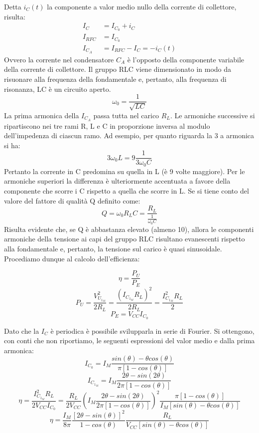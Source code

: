 Detta $i_C(t)$ la componente a valor medio nullo della corrente di collettore, risulta:
$$
\begin{aligned}
I_C     &=I_{C_0} + i_C\\
I_{RFC} &=I_{C_0}\\
I_{C_A} &=I_{RFC} -I_C = -i_C (t)
\end{aligned}
$$
Ovvero la corrente nel condensatore $C_A$ è l'opposto della componente variabile della corrente di
collettore.
Il gruppo RLC viene dimensionato in modo da risuonare alla frequenza della fondamentale e,
pertanto, alla frequenza di risonanza, LC è un circuito aperto.
$$\omega_0 = \frac{1}{\sqrt{LC}}$$
La prima armonica della $I_{C_A}$ passa tutta nel carico $R_L$. Le armoniche successive si ripartiscono nei tre rami R, L e C in proporzione inversa al modulo dell'impedenza di ciascun ramo. Ad esempio, per
quanto riguarda la 3 a armonica si ha:
$$
3 \omega_0 L = 9 \frac{1}{3 \omega_0 C}
$$
Pertanto la corrente in C predomina su quella in L (è 9 volte maggiore). Per le armoniche superiori
la differenza è ulteriormente accentuata a favore della componente che scorre i C rispetto a quella
che scorre in L. Se si tiene conto del valore del fattore di qualità Q definito come:
$$
Q = \omega_0 R_L C = \frac{R_L}{\frac{1}{\omega_0 C}}
$$
Risulta evidente che, se Q è abbastanza elevato (almeno 10), allora le componenti armoniche della tensione ai capi del gruppo
RLC risultano evanescenti rispetto alla fondamentale e, pertanto, la tensione sul carico è quasi
sinusoidale. Procediamo dunque al calcolo dell'efficienza:

\[\eta = \frac{P_U}{P_E}\]
\[P_U = \frac{V_{U_{1_M}}^2}{2R_L} = \frac{(I_{C_{1_M}} R_L)^2}{2R_L} = \frac{{I_{C_{1_M}}^2 R_L}}{2}\]
\[P_E = V_{CC}I_{C_0}\]

Dato che la $I_C$ è periodica è possibile svilupparla in serie di Fourier. Si ottengono, con conti che non riportiamo, le seguenti espressioni del valor medio e dalla prima armonica:
\[ I_{C_0} = I_M \frac{sin(\theta)-\theta cos(\theta)}{\pi \left[1-cos(\theta)\right]} \]
\[ I_{C_{1_M}} = I_M \frac{2\theta-sin(2\theta)}{2\pi \left[1-cos(\theta)\right]} \]
\[\eta = \frac{I_{C_{1_M}}^2 R_L}{2V_{CC}I_{C_0}} = \frac{R_L}{2V_{CC}} \left( I_M \frac{2\theta-sin(2\theta)}{2\pi \left[1-cos(\theta)\right]} \right)^2 
\frac{\pi \left[1-cos(\theta)\right]}{I_M\left[sin(\theta)-\theta cos(\theta)\right]}
\]
\[\eta = \frac{I_M}{8\pi} \frac{\left[2\theta - sin(\theta)\right]^2}{1-cos(\theta)} \frac{R_L}{V_{CC}\left[sin(\theta)-\theta cos(\theta)\right]} \]

